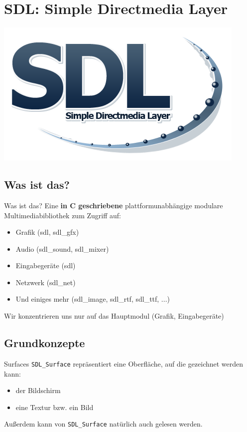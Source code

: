\section{SDL: Simple Directmedia Layer}
\begin{frame}
	\includegraphics[width=\textwidth]{images/SDL_logo.png}
\end{frame}

\subsection{Was ist das?}
\begin{frame}{Was ist das?}
	Eine \textbf{in C geschriebene} plattformunabhängige modulare Multimediabibliothek zum Zugriff auf:
	\begin{itemize}
		\item Grafik (sdl, sdl\_gfx)
		\item Audio (sdl\_sound, sdl\_mixer)
		\item Eingabegeräte (sdl)
		\item Netzwerk (sdl\_net)
		\item Und einiges mehr (sdl\_image, sdl\_rtf, sdl\_ttf, ...)
	\end{itemize}
	
	Wir konzentrieren uns nur auf das Hauptmodul (Grafik, Eingabegeräte)
\end{frame}

\subsection{Grundkonzepte}
\begin{frame}[fragile]{Surfaces}
	\verb|SDL_Surface| repräsentiert eine Oberfläche, auf die gezeichnet werden kann:
	\begin{itemize}
		\item der Bildschirm
		\item eine Textur bzw. ein Bild
	\end{itemize}
	Außerdem kann von \verb|SDL_Surface| natürlich auch gelesen werden.
\end{frame}

